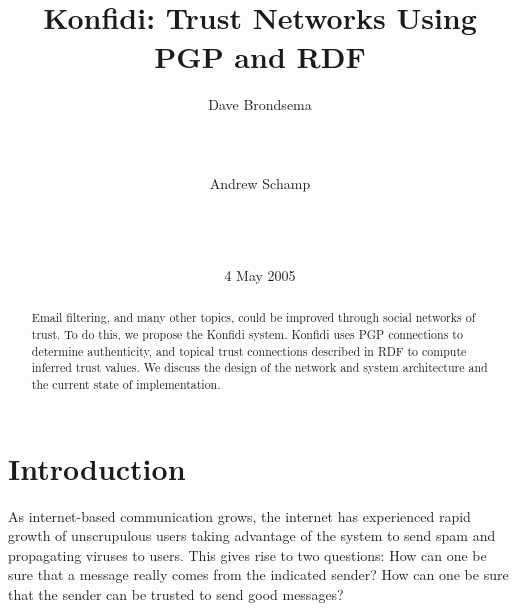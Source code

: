 \documentclass{acm_proc_article-sp}
\begin{document}

\title{Konfidi: Trust Networks Using PGP and RDF}


\author{
\alignauthor Dave Brondsema\\
       \\
       \\
       \\
\alignauthor Andrew Schamp\\
       \\
       \\
       \\
}

\date{4 May 2005}

\maketitle
\begin{abstract}
Email filtering, and many other topics, could be improved through social networks of trust.  To do this, we propose the Konfidi system.  Konfidi uses PGP connections to determine authenticity, and topical trust connections described in RDF to compute inferred trust values.  We discuss the design of the network and system architecture and the current state of implementation.
\end{abstract}


\section{Introduction}
As internet-based communication grows, the internet has experienced rapid growth of unscrupulous users taking advantage of the system to send spam and propagating viruses to users.  This gives rise to two questions: 
How can one be sure that a message really comes from the indicated sender?  How can one be sure that the sender can be trusted to send good messages?
\end{document}
